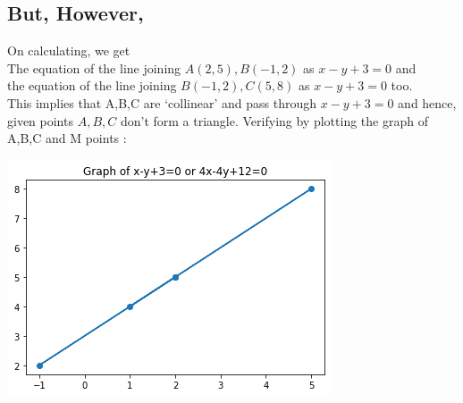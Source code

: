 \documentclass[12pt]{article}
\begin{document}
\subsection*{But, However,} On calculating, we get\\
The equation of the line joining $A(2,5), B(-1,2)$ as $x-y+3=0$ and \\
the equation of the line joining $B(-1,2), C(5,8)$ as $x-y+3=0$ too.\\
This implies that A,B,C are `collinear' and pass through $x-y+3=0$ and hence, given points $A,B,C$ don't form a triangle.\newline
Verifying by plotting the graph of A,B,C and M points :
\begin{center}
  \includegraphics[width=\textwidth]{prv1b.png}
\end{center}
    
\end{document}
